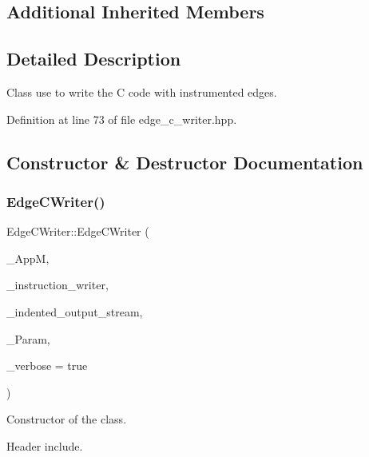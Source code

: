 \subsection*{Additional Inherited Members}


\subsection{Detailed Description}
Class use to write the C code with instrumented edges. 

Definition at line 73 of file edge\+\_\+c\+\_\+writer.\+hpp.



\subsection{Constructor \& Destructor Documentation}
\mbox{\label{classEdgeCWriter_a52eff5f5bbf3728891529a8164b5aaae}} 
\subsubsection{\texorpdfstring{Edge\+C\+Writer()}{EdgeCWriter()}}
{\footnotesize\ttfamily Edge\+C\+Writer\+::\+Edge\+C\+Writer (\begin{DoxyParamCaption}\item[{const \hyperlink{application__manager_8hpp_abb985163a2a3fb747f6f03b1eaadbb44}{application\+\_\+manager\+Const\+Ref}}]{\+\_\+\+AppM,  }\item[{const \hyperlink{instruction__writer_8hpp_a40ea26c38a2909ba48f88f997144b260}{Instruction\+Writer\+Ref}}]{\+\_\+instruction\+\_\+writer,  }\item[{const \hyperlink{indented__output__stream_8hpp_ab32278e11151ef292759c88e99b77feb}{Indented\+Output\+Stream\+Ref}}]{\+\_\+indented\+\_\+output\+\_\+stream,  }\item[{const \hyperlink{Parameter_8hpp_a37841774a6fcb479b597fdf8955eb4ea}{Parameter\+Const\+Ref}}]{\+\_\+\+Param,  }\item[{bool}]{\+\_\+verbose = {\ttfamily true} }\end{DoxyParamCaption})}



Constructor of the class. 

Header include.


